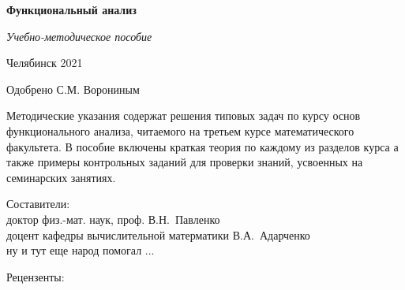 \documentclass[12pt]{article}						%
\begin{document}
\thispagestyle{empty} \vspace*{\baselineskip}
\vspace*{\baselineskip}
\begin{center}
	{\bf Функциональный анализ}
\end{center} {\large
\vspace*{\baselineskip}\vspace*{\baselineskip}\vspace*{\baselineskip}
\begin{center}
	{\it Учебно-методическое пособие}
\end{center}
\vspace*{\baselineskip}
\vspace*{\baselineskip}\vspace*{\baselineskip}\vspace*{\baselineskip}\vspace*{\baselineskip}\vspace*{\baselineskip}
\vspace*{\baselineskip}\vspace*{\baselineskip}\vspace*{\baselineskip}

\vspace*{\baselineskip}

\begin{center}
	Челябинск 2021
\end{center}

\newpage
\thispagestyle{empty} Одобрено С.М. Ворониным
\vspace*{\baselineskip}

	Методические указания содержат решения типовых задач по курсу основ функционального анализа, читаемого на третьем курсе математического факультета. В пособие включены краткая теория по каждому из разделов курса а также примеры контрольных заданий для проверки знаний, усвоенных на семинарских занятиях.

\vspace*{\baselineskip}
	Составители: \\
	доктор физ.-мат. наук, проф. В.Н.~Павленко\\
	доцент кафедры вычислительной матерматики В.А.~Адарченко\\
	ну и тут еще народ помогал ...\\
\vspace*{\baselineskip}

Рецензенты:

\newpage

}
\end{document}
